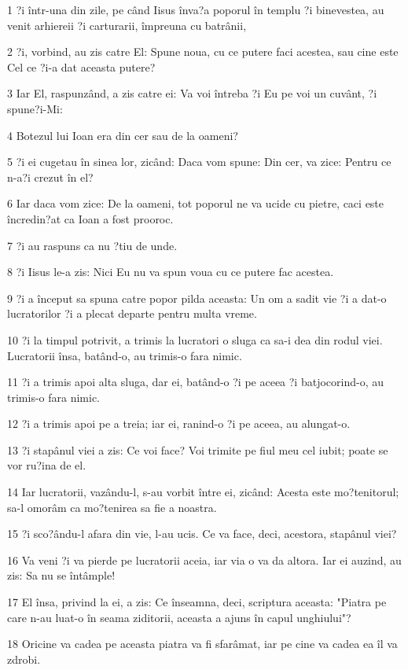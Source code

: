 \par 1 ?i într-una din zile, pe când Iisus înva?a poporul în templu ?i binevestea, au venit arhiereii ?i carturarii, împreuna cu batrânii,
\par 2 ?i, vorbind, au zis catre El: Spune noua, cu ce putere faci acestea, sau cine este Cel ce ?i-a dat aceasta putere?
\par 3 Iar El, raspunzând, a zis catre ei: Va voi întreba ?i Eu pe voi un cuvânt, ?i spune?i-Mi:
\par 4 Botezul lui Ioan era din cer sau de la oameni?
\par 5 ?i ei cugetau în sinea lor, zicând: Daca vom spune: Din cer, va zice: Pentru ce n-a?i crezut în el?
\par 6 Iar daca vom zice: De la oameni, tot poporul ne va ucide cu pietre, caci este încredin?at ca Ioan a fost prooroc.
\par 7 ?i au raspuns ca nu ?tiu de unde.
\par 8 ?i Iisus le-a zis: Nici Eu nu va spun voua cu ce putere fac acestea.
\par 9 ?i a început sa spuna catre popor pilda aceasta: Un om a sadit vie ?i a dat-o lucratorilor ?i a plecat departe pentru multa vreme.
\par 10 ?i la timpul potrivit, a trimis la lucratori o sluga ca sa-i dea din rodul viei. Lucratorii însa, batând-o, au trimis-o fara nimic.
\par 11 ?i a trimis apoi alta sluga, dar ei, batând-o ?i pe aceea ?i batjocorind-o, au trimis-o fara nimic.
\par 12 ?i a trimis apoi pe a treia; iar ei, ranind-o ?i pe aceea, au alungat-o.
\par 13 ?i stapânul viei a zis: Ce voi face? Voi trimite pe fiul meu cel iubit; poate se vor ru?ina de el.
\par 14 Iar lucratorii, vazându-l, s-au vorbit între ei, zicând: Acesta este mo?tenitorul; sa-l omorâm ca mo?tenirea sa fie a noastra.
\par 15 ?i sco?ându-l afara din vie, l-au ucis. Ce va face, deci, acestora, stapânul viei?
\par 16 Va veni ?i va pierde pe lucratorii aceia, iar via o va da altora. Iar ei auzind, au zis: Sa nu se întâmple!
\par 17 El însa, privind la ei, a zis: Ce înseamna, deci, scriptura aceasta: "Piatra pe care n-au luat-o în seama ziditorii, aceasta a ajuns în capul unghiului"?
\par 18 Oricine va cadea pe aceasta piatra va fi sfarâmat, iar pe cine va cadea ea îl va zdrobi.
